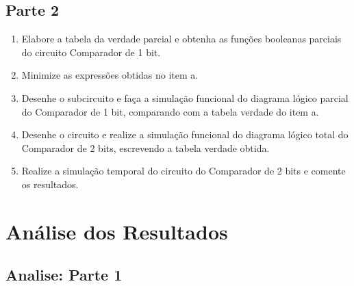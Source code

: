 \documentclass[12pt]{article}
\begin{document}
\subsection{Parte 2}
\begin{enumerate}[label=(\roman*)]
	\item Elabore a tabela da verdade parcial e obtenha as funções booleanas parciais do circuito
	Comparador de 1 bit.
	\item Minimize as expressões obtidas no item a.
	\item Desenhe o subcircuito e faça a simulação funcional do diagrama lógico parcial do
	Comparador de 1 bit, comparando com a tabela verdade do item a.
	\item Desenhe o circuito e realize a simulação funcional do diagrama lógico total do Comparador
	de 2 bits, escrevendo a tabela verdade obtida.
	\item Realize a simulação temporal do circuito do Comparador de 2 bits e comente os resultados.
\end{enumerate}

\section{Análise dos Resultados}
\label{sec:Resultados}
\subsection{Analise: Parte 1}
\end{document}
